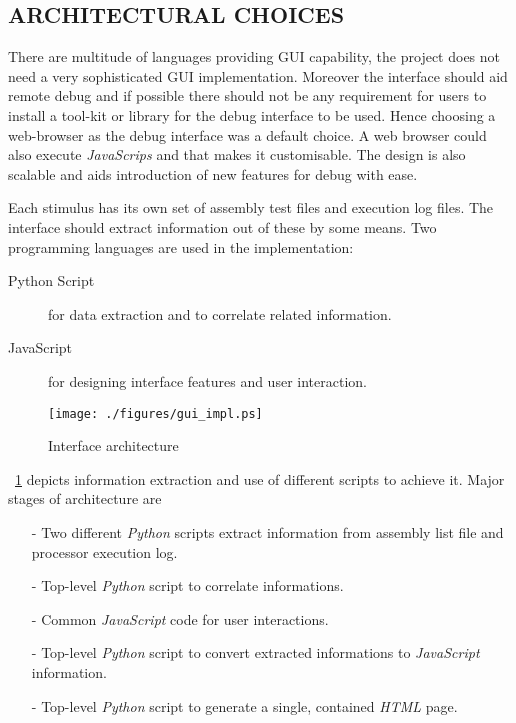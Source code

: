 \subsection {ARCHITECTURAL CHOICES}
There are multitude of languages providing GUI capability, the project does not need a very sophisticated GUI implementation. Moreover the interface should aid remote debug and if possible there should not be any requirement for users to install a tool-kit or library for the debug interface to be used. Hence choosing a web-browser as the debug interface was a default choice. A web browser could also execute {\it JavaScrips} and that makes it customisable. The design is also scalable and aids introduction of new features for debug with ease.

Each stimulus has its own set of assembly test files and execution log files. The interface should extract information out of these by some means. Two programming languages are used in the implementation:
\begin{description}
\item[Python Script] for data extraction and to correlate related information.
\item[JavaScript] for designing interface features and user interaction.
\end{description}

\begin{figure}[h]
\centering
\texttt{[image: ./figures/gui\_impl.ps]}
\caption{Interface architecture} 
\label{fig:gui_impl.eps}
\end{figure}

\figurename{~\ref{fig:gui_impl.eps}} depicts information extraction and use of different scripts to achieve it. Major stages of architecture are
\begin{itemize}
\item[-] Two different {\it Python} scripts extract information from assembly list file and processor execution log.
\item[-] Top-level {\it Python} script to correlate informations.
\item[-] Common {\it JavaScript} code for user interactions.
\item[-] Top-level {\it Python} script to convert extracted informations to {\it JavaScript} information. 
\item[-] Top-level {\it Python} script to generate a single, contained {\it HTML} page.
\end{itemize}

